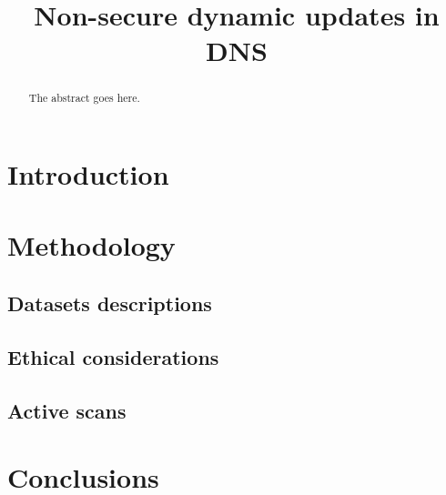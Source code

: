 \documentclass[conference]{IEEEtran}
\begin{document}
\title{Non-secure dynamic updates in DNS}

\author{
\and
{}
\and
{}
}

\maketitle



\begin{abstract}
The abstract goes here.
\end{abstract}

\section{Introduction}







\section{Methodology}
\subsection{Datasets descriptions}
\subsection{Ethical considerations}
\subsection{Active scans}








\section{Conclusions}


 
\end{document}
